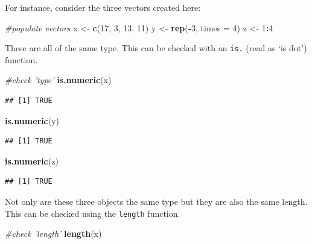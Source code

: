 \documentclass[
]{book}
\newenvironment{Shaded}{\begin{snugshade}}{\end{snugshade}}
\newcommand{\CommentTok}[1]{\textcolor[rgb]{0.56,0.35,0.01}{\textit{#1}}}
\newcommand{\DataTypeTok}[1]{\textcolor[rgb]{0.13,0.29,0.53}{#1}}
\newcommand{\DecValTok}[1]{\textcolor[rgb]{0.00,0.00,0.81}{#1}}
\newcommand{\KeywordTok}[1]{\textcolor[rgb]{0.13,0.29,0.53}{\textbf{#1}}}
\newcommand{\NormalTok}[1]{#1}
\newcommand{\OperatorTok}[1]{\textcolor[rgb]{0.81,0.36,0.00}{\textbf{#1}}}
\newcommand{\StringTok}[1]{\textcolor[rgb]{0.31,0.60,0.02}{#1}}
\theoremstyle{definition}
\theoremstyle{definition}
\theoremstyle{definition}
\theoremstyle{remark}
\begin{document}
For instance, consider the three vectors created here:

\begin{Shaded}
\begin{Highlighting}[]
\CommentTok{#populate vectors}
\NormalTok{x <-}\StringTok{ }\KeywordTok{c}\NormalTok{(}\DecValTok{17}\NormalTok{, }\DecValTok{3}\NormalTok{, }\DecValTok{13}\NormalTok{, }\DecValTok{11}\NormalTok{)}
\NormalTok{y <-}\StringTok{ }\KeywordTok{rep}\NormalTok{(}\OperatorTok{-}\DecValTok{3}\NormalTok{, }\DataTypeTok{times =} \DecValTok{4}\NormalTok{)}
\NormalTok{z <-}\StringTok{ }\DecValTok{1}\OperatorTok{:}\DecValTok{4}
\end{Highlighting}
\end{Shaded}

These are all of the same type. This can be checked with an \texttt{is.} (read as `is dot') function.

\begin{Shaded}
\begin{Highlighting}[]
\CommentTok{#check 'type'}
\KeywordTok{is.numeric}\NormalTok{(x)}
\end{Highlighting}
\end{Shaded}

\begin{verbatim}
## [1] TRUE
\end{verbatim}

\begin{Shaded}
\begin{Highlighting}[]
\KeywordTok{is.numeric}\NormalTok{(y)}
\end{Highlighting}
\end{Shaded}

\begin{verbatim}
## [1] TRUE
\end{verbatim}

\begin{Shaded}
\begin{Highlighting}[]
\KeywordTok{is.numeric}\NormalTok{(z)}
\end{Highlighting}
\end{Shaded}

\begin{verbatim}
## [1] TRUE
\end{verbatim}

Not only are these three objects the same type but they are also the same length. This can be checked using the \texttt{length} function.

\begin{Shaded}
\begin{Highlighting}[]
\CommentTok{#check 'length'}
\KeywordTok{length}\NormalTok{(x)}
\end{Highlighting}
\end{Shaded}
\end{document}
